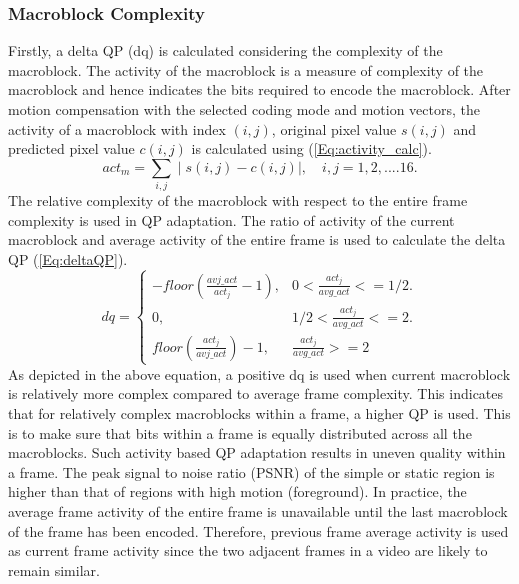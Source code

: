 \documentclass[11pt]{article} %
\begin{document}
\subsubsection{Macroblock Complexity}	
	Firstly, a delta QP (dq) is calculated considering the complexity of the macroblock. The activity of the macroblock is a measure of complexity of the macroblock and hence indicates the bits required to encode the macroblock. After motion compensation with the selected coding mode and motion vectors, the activity of a macroblock with index $(i,j)$, original pixel value $s(i,j)$ and predicted pixel value $c(i,j)$ is calculated using (\ref{Eq:activity_calc}). 
\begin{equation}
	\label{Eq:activity_calc}
	act_m = \sum_{i,j} \mid s(i,j)-c(i,j) \mid ,\quad	i,j = 1,2,....16.
\end{equation}	
	 The relative complexity of the macroblock with respect to the entire frame complexity is used in QP adaptation. The ratio of activity of the current macroblock and average activity of the entire frame is used to calculate the delta QP (\ref{Eq:deltaQP}).
\begin{equation}
	\label{Eq:deltaQP}
	dq = \begin{cases}
		-floor(\frac{avj\_act} {act_j} - 1), &  0 < \frac{act_j}{avg\_act} <= 1/2.\\
		0, & 1/2 < \frac{act_j}{avg\_act} <= 2.\\
		floor(\frac{act_j} {avj\_act}) - 1, & \frac{act_j}{avg\_act} >= 2
	\end{cases}
\end{equation}
As depicted in the above equation, a positive dq is used when current macroblock is relatively more complex compared to average frame complexity. This indicates that for relatively complex macroblocks within a frame, a higher QP is used. This is to make sure that bits within a frame is equally distributed across all the macroblocks. Such activity based QP adaptation results in uneven quality within a frame. The peak signal to noise ratio (PSNR) of the simple or static region is higher than that of regions with high motion (foreground). In practice, the average frame activity of the entire frame is unavailable until the last macroblock of the frame has been encoded. Therefore, previous frame average activity is used as current frame activity since the two adjacent frames in a video are likely to remain similar. 
\end{document}
